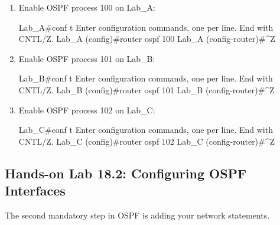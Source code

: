 \begin{enumerate}
\item
  Enable OSPF process 100 on Lab\_A:

\begin{cli}
Lab_A#conf t
Enter configuration commands, one per line.
  End with CNTL/Z.
Lab_A (config)#router ospf 100
Lab_A (config-router)#^Z
\end{cli}
\item
  Enable OSPF process 101 on Lab\_B:

\begin{cli}
Lab_B#conf t
Enter configuration commands, one per line.
  End with CNTL/Z.
Lab_B (config)#router ospf 101
Lab_B (config-router)#^Z
\end{cli}
\item
  Enable OSPF process 102 on Lab\_C:

\begin{cli}
Lab_C#conf t
Enter configuration commands, one per line.
  End with CNTL/Z.
Lab_C (config)#router ospf 102
Lab_C (config-router)#^Z
\end{cli}
\end{enumerate}

\subsection[Hands-on Lab 18.2: Configuring OSPF
Interfaces]{\texorpdfstring{\protect\hypertarget{c18.xhtmlux5cux23c18-sec-22}{}{}Hands-on
Lab 18.2: Configuring OSPF
Interfaces}{Hands-on Lab 18.2: Configuring OSPF Interfaces}}

The second mandatory step in OSPF is adding your network statements.

